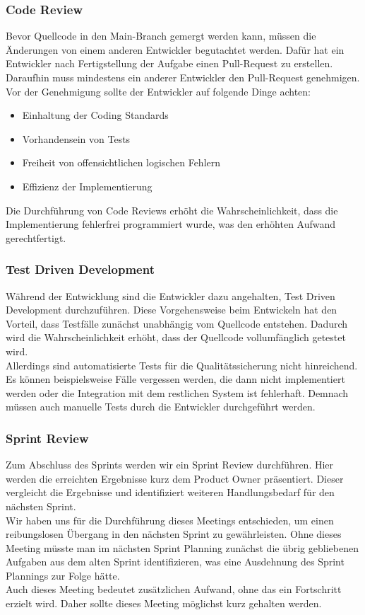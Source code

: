 \documentclass{article}
\begin{document}
\subsubsection{Code Review}
Bevor Quellcode in den Main-Branch gemergt werden kann, müssen die Änderungen von einem anderen Entwickler begutachtet werden.
Dafür hat ein Entwickler nach Fertigstellung der Aufgabe einen Pull-Request zu erstellen.
Daraufhin muss mindestens ein anderer Entwickler den Pull-Request genehmigen.
Vor der Genehmigung sollte der Entwickler auf folgende Dinge achten:
\begin{itemize}
	\item Einhaltung der Coding Standards
	\item Vorhandensein von Tests
	\item Freiheit von offensichtlichen logischen Fehlern
	\item Effizienz der Implementierung
\end{itemize}
Die Durchführung von Code Reviews erhöht die Wahrscheinlichkeit, dass die Implementierung fehlerfrei programmiert wurde, was den erhöhten Aufwand gerechtfertigt.

\subsubsection{Test Driven Development}
Während der Entwicklung sind die Entwickler dazu angehalten, Test Driven Development durchzuführen.
Diese Vorgehensweise beim Entwickeln hat den Vorteil, dass Testfälle zunächst unabhängig vom Quellcode entstehen.
Dadurch wird die Wahrscheinlichkeit erhöht, dass der Quellcode vollumfänglich getestet wird.\\
Allerdings sind automatisierte Tests für die Qualitätssicherung nicht hinreichend.
Es können beispielsweise Fälle vergessen werden, die dann nicht implementiert werden oder die Integration mit dem restlichen System ist fehlerhaft.
Demnach müssen auch manuelle Tests durch die Entwickler durchgeführt werden.

\subsubsection{Sprint Review}
Zum Abschluss des Sprints werden wir ein Sprint Review durchführen.
Hier werden die erreichten Ergebnisse kurz dem Product Owner präsentiert.
Dieser vergleicht die Ergebnisse und identifiziert weiteren Handlungsbedarf für den nächsten Sprint.\\
Wir haben uns für die Durchführung dieses Meetings entschieden, um einen reibungslosen Übergang in den nächsten Sprint zu gewährleisten.
Ohne dieses Meeting müsste man im nächsten Sprint Planning zunächst die übrig gebliebenen Aufgaben aus dem alten Sprint identifizieren, was eine Ausdehnung des Sprint Plannings zur Folge hätte.\\
Auch dieses Meeting bedeutet zusätzlichen Aufwand, ohne das ein Fortschritt erzielt wird.
Daher sollte dieses Meeting möglichst kurz gehalten werden.
\end{document}
